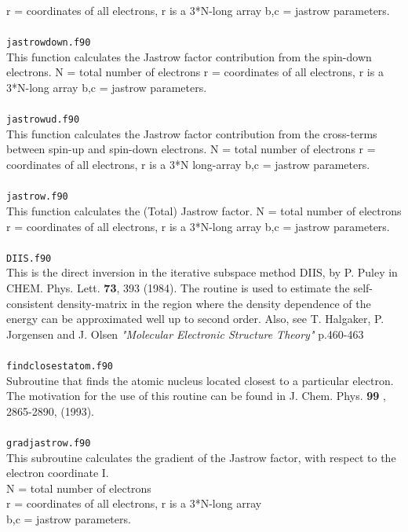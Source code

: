 \documentclass[a4paper,twoside,openany]{book}
\begin{document}
{{r = coordinates of all electrons, r is a 3*N-long array
b,c = jastrow parameters. \\ \\
\newpage
\noindent
\texttt{jastrowdown.f90}\\
This function calculates the Jastrow factor contribution
from the spin-down electrons. N = total number of electrons
r = coordinates of all electrons, r is a 3*N-long array
b,c = jastrow parameters.  \\ \\
\texttt{jastrowud.f90}\\
This function calculates the Jastrow factor contribution
from the cross-terms between spin-up and spin-down electrons. 
N = total number of electrons  r = coordinates of all electrons, r is a 3*N long-array
b,c = jastrow parameters. \\ \\
\texttt{jastrow.f90}\\
This function calculates the (Total) Jastrow factor.
N = total number of electrons
r = coordinates of all electrons, r is a 3*N-long array
b,c = jastrow parameters.  \\ \\
\texttt{DIIS.f90}\\
This is the direct inversion in the iterative subspace method DIIS,
by P. Puley in CHEM. Phys. Lett. {\bf 73}, 393 (1984). The routine is 
used to estimate the self-consistent density-matrix in the region 
where the density dependence of the energy can be approximated well
up to second order. Also, see T. Halgaker, P. Jorgensen and J. Olsen 
 {\it "Molecular Electronic Structure Theory"} p.460-463 \\ \\
 \texttt{findclosestatom.f90}\\
 Subroutine that finds the atomic nucleus located closest to a particular electron. The motivation for 
 the use of this routine can be found in J. Chem. Phys. {\bf 99} , 2865-2890, (1993). \\ \\
 \texttt{gradjastrow.f90}\\
 This subroutine calculates the gradient of the Jastrow factor,
with respect to the electron coordinate I. \\
N = total number of electrons \\
r = coordinates of all electrons, r is a 3*N-long array \\
b,c = jastrow parameters. \\ \\
}}
\end{document}

